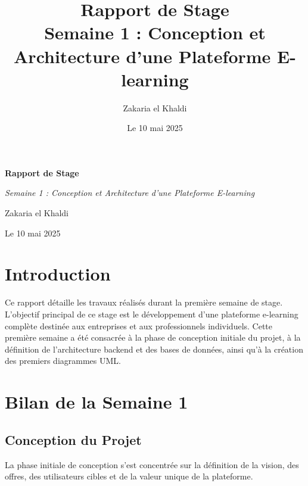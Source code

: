 \documentclass[12pt, a4paper]{article}
\title{\Huge\bfseries\color{primary} Rapport de Stage \\ 
      \Large Semaine 1 : Conception et Architecture d'une Plateforme E-learning}
\author{\Large Zakaria el Khaldi}
\date{\large Le 10 mai 2025}
\begin{document}
\begin{titlepage}
  \centering
  {\Huge\bfseries\color{primary} Rapport de Stage \par}
  \vspace{1cm}
  {\Large\itshape Semaine 1 : Conception et Architecture d'une Plateforme E-learning\par}
  \vspace{2cm}
  
  \vspace{2cm}
  {\Large Zakaria el Khaldi\par}
  \vfill
  {\large Le 10 mai 2025\par}
\end{titlepage}

\tableofcontents
\thispagestyle{empty}
\newpage

\section{Introduction}
\thispagestyle{fancy}
Ce rapport détaille les travaux réalisés durant la première semaine de stage. L'objectif principal de ce stage est le développement d'une plateforme e-learning complète destinée aux entreprises et aux professionnels individuels. Cette première semaine a été consacrée à la phase de conception initiale du projet, à la définition de l'architecture backend et des bases de données, ainsi qu'à la création des premiers diagrammes UML.

\section{Bilan de la Semaine 1}

\subsection{Conception du Projet}
La phase initiale de conception s'est concentrée sur la définition de la vision, des offres, des utilisateurs cibles et de la valeur unique de la plateforme.
\end{document}
